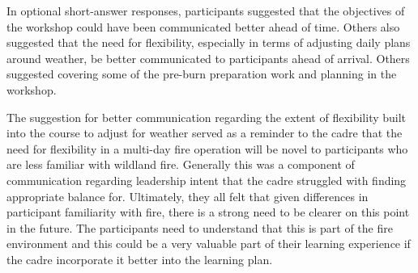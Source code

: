 \documentclass[fire,article,submit,moreauthors,pdftex]{Definitions/mdpi}
\begin{document}
In optional short-answer responses, participants suggested that the objectives of the workshop could have been communicated better ahead of time.
Others also suggested that the need for flexibility, especially in terms of adjusting daily plans around weather, be better communicated to participants ahead of arrival.
Others suggested covering some of the pre-burn preparation work and planning in the workshop.

The suggestion for better communication regarding the extent of flexibility built into the course to adjust for weather served as a reminder to the cadre that the need for flexibility in a multi-day fire operation will be novel to participants who are less familiar with wildland fire.
Generally this was a component of communication regarding leadership intent that the cadre struggled with finding appropriate balance for. 
Ultimately, they all felt that given differences in participant familiarity with fire, there is a strong need to be clearer on this point in the future.  
The participants need to understand that this is part of the fire environment and this could be a very valuable part of their learning experience if the cadre incorporate it better into the learning plan.
\end{document}

